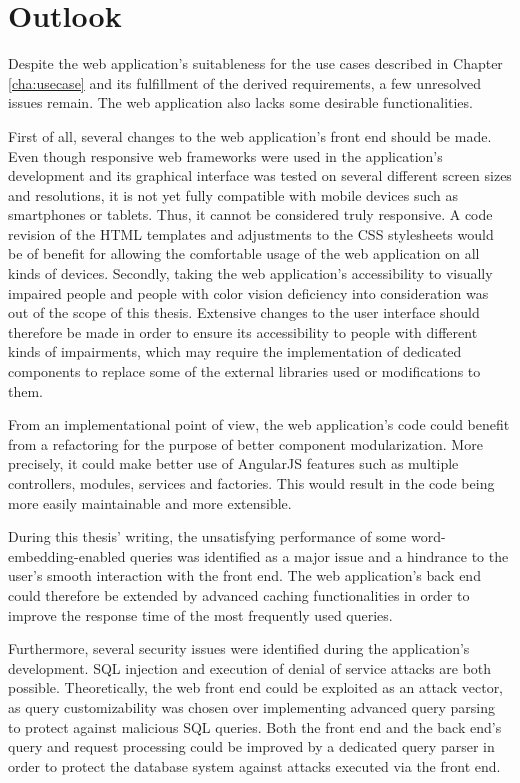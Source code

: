 \section{Outlook}
Despite the web application's suitableness for the use cases described in Chapter \ref{cha:usecase} and its fulfillment of the derived requirements, a few unresolved issues remain. The web application also lacks some desirable functionalities.

First of all, several changes to the web application's front end should be made. Even though responsive web frameworks were used in the application's development and its graphical interface was tested on several different screen sizes and resolutions, it is not yet fully compatible with mobile devices such as smartphones or tablets. Thus, it cannot be considered truly responsive. A code revision of the HTML templates and adjustments to the CSS stylesheets would be of benefit for allowing the comfortable usage of the web application on all kinds of devices. Secondly, taking the web application's accessibility to visually impaired people and people with color vision deficiency into consideration was out of the scope of this thesis. Extensive changes to the user interface should therefore be made in order to ensure its accessibility to people with different kinds of impairments, which may require the implementation of dedicated components to replace some of the external libraries used or modifications to them.

From an implementational point of view, the web application's code could benefit from a refactoring for the purpose of better component modularization. More precisely, it could make better use of AngularJS features such as multiple controllers, modules, services and factories. This would result in the code being more easily maintainable and more extensible.

During this thesis' writing, the unsatisfying performance of some word-embedding-enabled queries was identified as a major issue and a hindrance to the user's smooth interaction with the front end. The web application's back end could therefore be extended by advanced caching functionalities in order to improve the response time of the most frequently used queries.

Furthermore, several security issues were identified during the application's development. SQL injection and execution of denial of service attacks are both possible. Theoretically, the web front end could be exploited as an attack vector, as query customizability was chosen over implementing advanced query parsing to protect against malicious SQL queries. Both the front end and the back end's query and request processing could be improved by a dedicated query parser in order to protect the database system against attacks executed via the front end.

